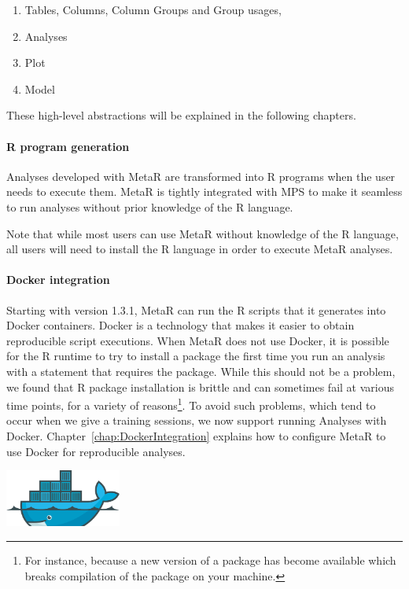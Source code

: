 \begin{enumerate}
	\item Tables, Columns, Column Groups and Group usages,
	\item Analyses
	\item Plot
	\item Model
\end{enumerate}

\noindent{}These high-level abstractions will be explained in the following chapters.

\paragraph{R program generation}
Analyses developed with MetaR are transformed into R programs when the user needs to execute them. MetaR is tightly integrated with MPS to make it seamless to run analyses without prior knowledge of the R language.
\begin{remark}
Note that while most users can use MetaR without knowledge of the R language, all users will need to install the R language in order to execute MetaR analyses.
\end{remark}

\paragraph{Docker integration}

Starting with version 1.3.1, MetaR can run the R scripts that it generates into Docker containers. Docker is a technology that makes it easier to obtain reproducible script executions. When MetaR does not use Docker, it is possible for the R runtime to try to install a package the first time you run an analysis with a statement that requires the package. While this should not be a problem, we found that R package installation is brittle and can sometimes fail at various time points, for a variety of reasons\footnote{For instance, because a new version of a package has become available which breaks compilation of the package on your machine.}. To avoid such problems, which tend to occur when we give a training sessions, we now support running Analyses with Docker. Chapter~\ref{chap:DockerIntegration} explains how to configure MetaR to use Docker for reproducible analyses.
\mbox{}
\begin{flushright}
\includegraphics[width=1.5in]{figures/DockerImage.png}
\end{flushright}
